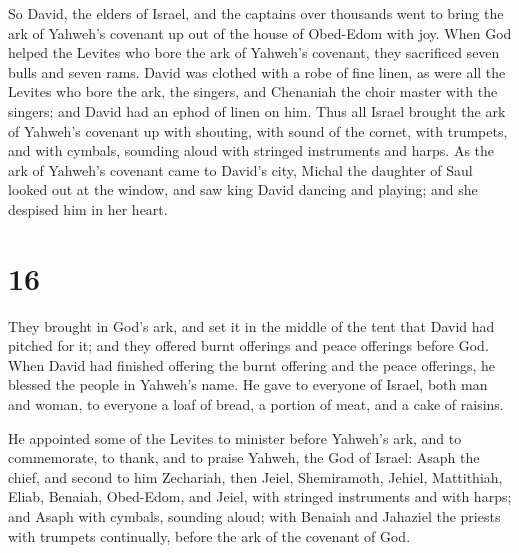  So David, the elders of Israel, and the captains over
thousands went to bring the ark of Yahweh's covenant up out of the house
of Obed-Edom with joy.  When God helped the Levites who
bore the ark of Yahweh's covenant, they sacrificed seven bulls and seven
rams.  David was clothed with a robe of fine linen, as were
all the Levites who bore the ark, the singers, and Chenaniah the choir
master with the singers; and David had an ephod of linen on him.
 Thus all Israel brought the ark of Yahweh's covenant up
with shouting, with sound of the cornet, with trumpets, and with
cymbals, sounding aloud with stringed instruments and harps.
 As the ark of Yahweh's covenant came to David's city,
Michal the daughter of Saul looked out at the window, and saw king David
dancing and playing; and she despised him in her heart.

\hypertarget{section-15}{%
\section{16}\label{section-15}}

 They brought in God's ark, and set it in the middle of the
tent that David had pitched for it; and they offered burnt offerings and
peace offerings before God.  When David had finished
offering the burnt offering and the peace offerings, he blessed the
people in Yahweh's name.  He gave to everyone of Israel,
both man and woman, to everyone a loaf of bread, a portion of meat, and
a cake of raisins.

 He appointed some of the Levites to minister before
Yahweh's ark, and to commemorate, to thank, and to praise Yahweh, the
God of Israel:  Asaph the chief, and second to him
Zechariah, then Jeiel, Shemiramoth, Jehiel, Mattithiah, Eliab, Benaiah,
Obed-Edom, and Jeiel, with stringed instruments and with harps; and
Asaph with cymbals, sounding aloud;  with Benaiah and
Jahaziel the priests with trumpets continually, before the ark of the
covenant of God.


